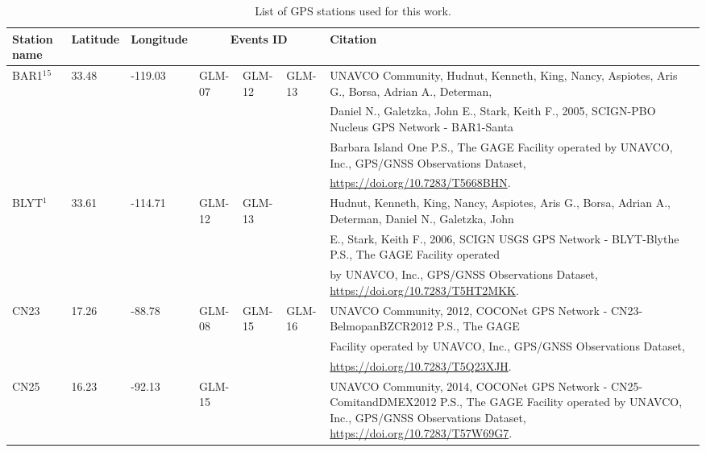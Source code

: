 \clearpage
\onecolumn
\footnotesize
\begin{landscape}
  \begin{longtable}{llllllp{12cm}}
      \caption{List of GPS stations used for this work.}
      \label{tab:table-stations}
      \endfirsthead
      \endhead
    \hline
    Station name & Latitude & Longitude & \multicolumn{3}{c}{Events ID}  & Citation \\\hline
    \multirow{4}{*}{BAR1\hyperlink{Hudnut}{${}^1$}\hyperlink{Hudnut2}{${}^5$}} & \multirow{4}{*}{33.48} & \multirow{4}{*}{-119.03} & \multirow{4}{*}{GLM-07} & \multirow{4}{*}{GLM-12} & \multirow{4}{*}{GLM-13} & UNAVCO Community, Hudnut, Kenneth, King, Nancy, Aspiotes, Aris G., Borsa, Adrian A., Determan, \\
    &&&&&& Daniel N., Galetzka, John E., Stark, Keith F., 2005, SCIGN-PBO Nucleus GPS Network - BAR1-Santa \\
    &&&&&& Barbara Island One P.S., The GAGE Facility operated by UNAVCO, Inc., GPS/GNSS Observations Dataset, \\
    &&&&&& \url{https://doi.org/10.7283/T5668BHN}.\\\hline
    \multirow{3}{*}{BLYT\hyperlink{Hudnut}{${}^1$}} & \multirow{3}{*}{33.61} & \multirow{3}{*}{-114.71} &  \multirow{3}{*}{GLM-12} & \multirow{3}{*}{GLM-13}  & & Hudnut, Kenneth, King, Nancy, Aspiotes, Aris G., Borsa, Adrian A., Determan, Daniel N., Galetzka, John \\
    &&&&&& E., Stark, Keith F., 2006, SCIGN USGS GPS Network - BLYT-Blythe P.S., The GAGE Facility operated \\
    &&&&&&  by UNAVCO, Inc., GPS/GNSS Observations Dataset, \url{https://doi.org/10.7283/T5HT2MKK}.\\\hline
    \multirow{3}{*}{CN23} & \multirow{3}{*}{17.26} & \multirow{3}{*}{-88.78} &\multirow{3}{*}{GLM-08} & \multirow{3}{*}{GLM-15} & \multirow{3}{*}{GLM-16} & UNAVCO Community, 2012, COCONet GPS Network - CN23-BelmopanBZCR2012 P.S., The GAGE \\
    &&&&&& Facility operated by UNAVCO, Inc., GPS/GNSS Observations Dataset, \\
    &&&&&& \url{https://doi.org/10.7283/T5Q23XJH}.\\\hline
    \multirow{3}{*}{CN25} & \multirow{3}{*}{16.23} & \multirow{3}{*}{-92.13} & \multirow{3}{*}{GLM-15} & & & UNAVCO Community, 2014, COCONet GPS Network - CN25-ComitandDMEX2012 P.S., The GAGE Facility operated by UNAVCO, Inc., GPS/GNSS Observations Dataset, \url{https://doi.org/10.7283/T57W69G7}.\\\hline

\end{longtable}
\end{landscape}
